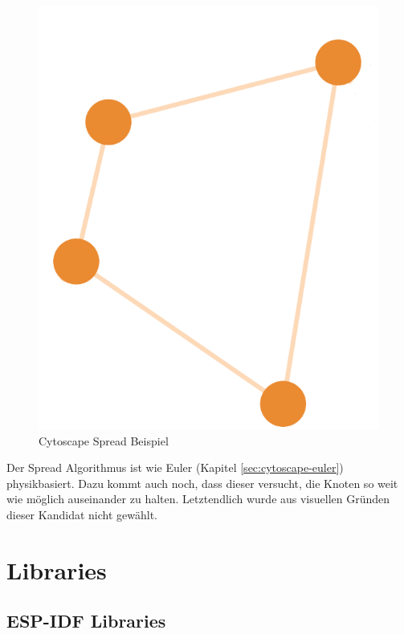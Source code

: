 \begin{figure}[H] 
    \begin{center}
        \includegraphics[scale=0.7]{images/cytoscape-spread-example.png}
        \caption{Cytoscape Spread Beispiel \cite{cytoscape_spread}}
        \label{abb:cytoscape-spread-example}
    \end{center}    
\end{figure}

Der Spread Algorithmus ist wie Euler (Kapitel \ref{sec:cytoscape-euler}) physikbasiert. Dazu kommt auch noch, dass dieser versucht, die Knoten so weit wie möglich auseinander zu halten. Letztendlich wurde aus visuellen Gründen dieser Kandidat nicht gewählt.

\section{Libraries}\label{sec:libraries}

\subsection{ESP-IDF Libraries}\label{sec:esp-idf-libraries}

